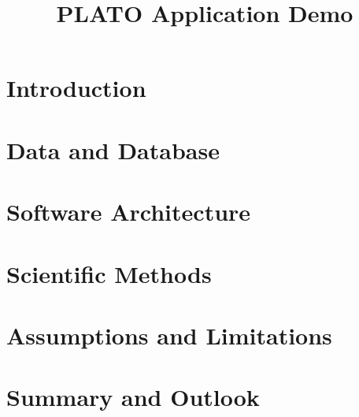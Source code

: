\documentclass[11pt,a4paper]{report}
\title{PLATO Application Demo}
\author{}
\date{}
\begin{document}
\maketitle

\tableofcontents
\clearpage

\chapter{Introduction}

\chapter{Data and Database}

\chapter{Software Architecture}

\chapter{Scientific Methods}

\chapter{Assumptions and Limitations}

\chapter{Summary and Outlook}
\end{document}
